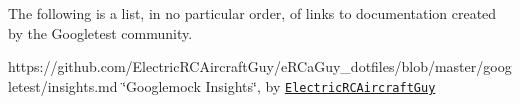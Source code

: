 The following is a list, in no particular order, of links to documentation created by the Googletest community.


\begin{DoxyItemize}
\item https\+://github.com/\+Electric\+R\+C\+Aircraft\+Guy/e\+R\+Ca\+Guy\+\_\+dotfiles/blob/master/googletest/insights.\+md \char`\"{}\+Googlemock Insights\char`\"{}, by \href{https://github.com/ElectricRCAircraftGuy}{\tt Electric\+R\+C\+Aircraft\+Guy} 
\end{DoxyItemize}
